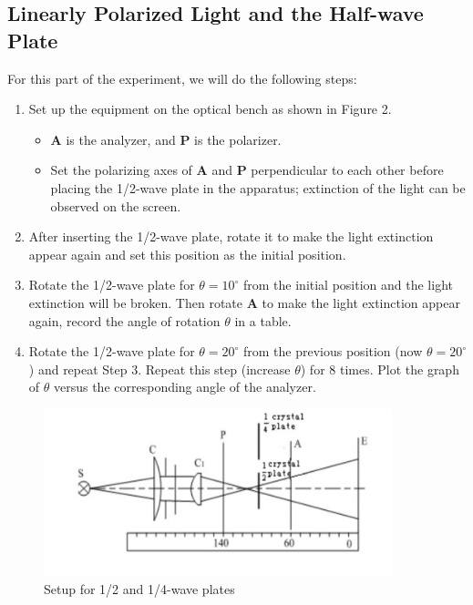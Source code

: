 \documentclass[12pt, a4paper, oneside]{article}
\begin{document}
\subsection{Linearly Polarized Light and the Half-wave Plate}
\indent

For this part of the experiment, we will do the following steps:
\begin{enumerate}
    \item Set up the equipment on the optical bench as shown in Figure 2.
    \begin{itemize}
        \item \textbf{A} is the analyzer, and \textbf{P} is the polarizer.
        \item Set the polarizing axes of \textbf{A} and \textbf{P} perpendicular to each other before placing the 1/2-wave plate in the apparatus; extinction of the light can be observed on the screen.
    \end{itemize}
    \item After inserting the 1/2-wave plate, rotate it to make the light extinction appear again and set this position as the initial position.
    \item Rotate the 1/2-wave plate for $\theta = 10^\circ$ from the initial position and the light extinction will be broken. Then rotate \textbf{A} to make the light extinction appear again, record the angle of rotation $\theta$ in a table.
    \item Rotate the 1/2-wave plate for $\theta = 20^\circ$ from the previous position (now $\theta = 20^\circ$) and repeat Step 3. Repeat this step (increase $\theta$) for 8 times. Plot the graph of $\theta$ versus the corresponding angle of the analyzer.
\end{enumerate}

\begin{figure}
	\centering
	\includegraphics[width=0.9\textwidth]{TwoWave.jpg}
	\caption{Setup for 1/2 and 1/4-wave plates}
	\label{fig2}
\end{figure}
\end{document}
